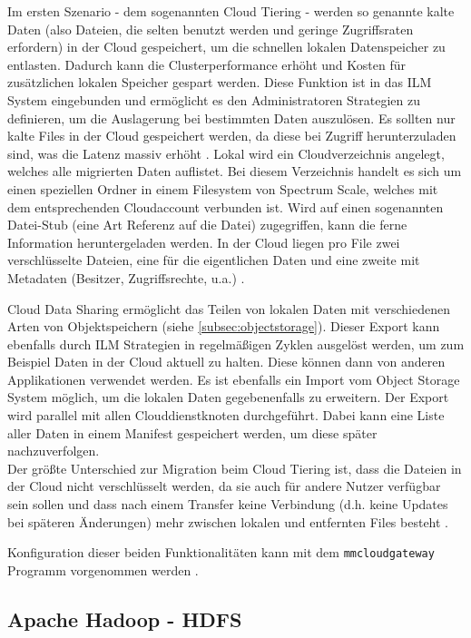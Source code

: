 Im ersten Szenario - dem sogenannten Cloud Tiering - werden so genannte kalte Daten (also Dateien, die selten benutzt werden und geringe Zugriffsraten erfordern) in der Cloud gespeichert, um die schnellen lokalen Datenspeicher zu entlasten. Dadurch kann die Clusterperformance erhöht und Kosten für zusätzlichen lokalen Speicher gespart werden. Diese Funktion ist in das \ac{ILM} System eingebunden und ermöglicht es den Administratoren Strategien zu definieren, um die Auslagerung bei bestimmten Daten auszulösen.
Es sollten nur kalte Files in der Cloud gespeichert werden, da diese bei Zugriff herunterzuladen sind, was die Latenz massiv erhöht \parencite[S. 107]{ibm.2017}.
Lokal wird ein Cloudverzeichnis angelegt, welches alle migrierten Daten auflistet. Bei diesem Verzeichnis handelt es sich um einen speziellen Ordner in einem Filesystem von Spectrum Scale, welches mit dem entsprechenden Cloudaccount verbunden ist. Wird auf einen sogenannten Datei-Stub (eine Art Referenz auf die Datei) zugegriffen, kann die ferne Information heruntergeladen werden. In der Cloud liegen pro File zwei verschlüsselte Dateien, eine für die eigentlichen Daten und eine zweite mit Metadaten (Besitzer, Zugriffsrechte, u.a.) \parencite[S. 108]{ibm.2017}.

Cloud Data Sharing ermöglicht das Teilen von lokalen Daten mit verschiedenen Arten von Objektspeichern (siehe \autoref{subsec:objectstorage}). Dieser Export kann ebenfalls durch \ac{ILM} Strategien in regelmäßigen Zyklen ausgelöst werden, um zum Beispiel Daten in der Cloud aktuell zu halten. Diese können dann von anderen Applikationen verwendet werden. Es ist ebenfalls ein Import vom Object Storage System möglich, um die lokalen Daten gegebenenfalls zu erweitern.
Der Export wird parallel mit allen Clouddienstknoten durchgeführt. Dabei kann eine Liste aller Daten in einem Manifest gespeichert werden, um diese später nachzuverfolgen.\\
Der größte Unterschied zur Migration beim Cloud Tiering ist, dass die Dateien in der Cloud nicht verschlüsselt werden, da sie auch für andere Nutzer verfügbar sein sollen und dass nach einem Transfer keine Verbindung (d.h. keine Updates bei späteren Änderungen) mehr zwischen lokalen und entfernten Files besteht \parencite[S. 109]{ibm.2017}.

Konfiguration dieser beiden Funktionalitäten kann mit dem \lstinline|mmcloudgateway| Programm vorgenommen werden \parencite{scale.2017}.

\subsection{Apache Hadoop - HDFS}

